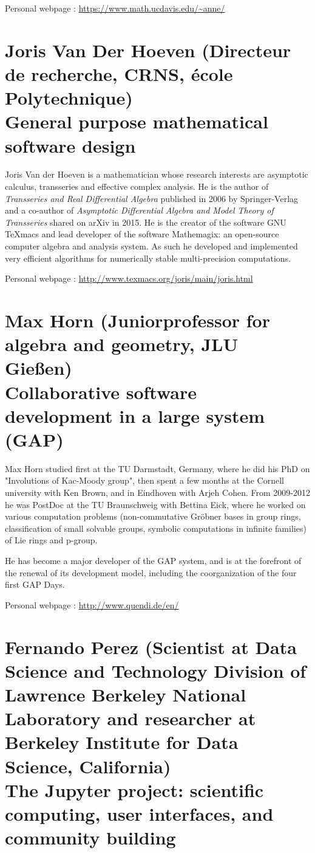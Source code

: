 \documentclass{paper}
\newcommand{\orateur}[3]{%
  \section*{%
    #1 {\small(#2)}\nopagebreak\\
    #3}
}
\begin{document}
\medskip

Personal webpage : \url{https://www.math.ucdavis.edu/~anne/}

\orateur
{Joris Van Der Hoeven}
{Directeur de recherche, CRNS, école Polytechnique}
{General purpose mathematical software design}

Joris Van der Hoeven is a mathematician whose research interests are
asymptotic calculus, transseries and effective complex analysis. 
He is the author of \textit{Transseries and Real Differential Algebra}
published in 2006 by Springer-Verlag and a co-author of \textit{Asymptotic
 Differential Algebra and Model Theory of Transseries} shared on arXiv in 2015.
He is the creator of the software GNU TeXmacs and lead developer
of the software Mathemagix: an open-source computer algebra and analysis system. 
As such he developed and implemented very efficient algorithms for numerically stable 
multi-precision computations.

\medskip

Personal webpage : \url{http://www.texmacs.org/joris/main/joris.html}

\orateur
{Max Horn}
{Juniorprofessor for algebra and geometry, JLU Gießen}
{Collaborative software development in a large system (GAP)}
{
  Max Horn studied first at the TU Darmstadt, Germany, where he did
  his PhD on "Involutions of Kac-Moody group", then spent a few months
  at the Cornell university with Ken Brown, and in Eindhoven with
  Arjeh Cohen. From 2009-2012 he was PostDoc at the TU Braunschweig
  with Bettina Eick, where he worked on various computation problems
  (non-commutative Gröbner bases in group rings, classification of
  small solvable groups, symbolic computations in infinite families)
  of Lie rings and p-group.


  He has become a major developer of the GAP system, and is at the
  forefront of the renewal of its development model, including the
  coorganization of the four first GAP Days.

\medskip

Personal webpage : \url{http://www.quendi.de/en/}
}

\orateur
{Fernando Perez}
{Scientist at Data Science and Technology Division of Lawrence Berkeley National Laboratory and researcher at Berkeley Institute for Data Science, California}
{The Jupyter project: scientific computing, user interfaces, and community building}
\end{document}
